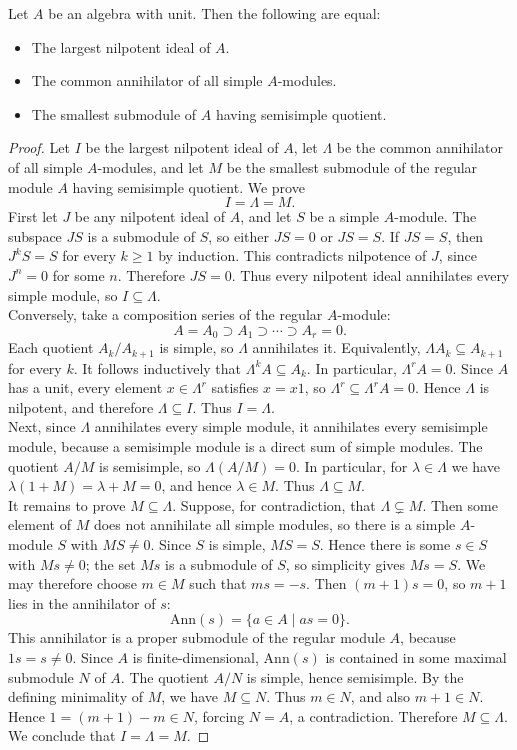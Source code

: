 \documentclass[../Odyssey_Project.tex]{subfiles}
\begin{document}
\begin{theorem}
\label{thm:13.23}
Let $A$ be an algebra with unit. Then the following are equal:
\begin{itemize}
    \item The largest nilpotent ideal of $A$.
    \item The common annihilator of all simple $A$-modules.
    \item The smallest submodule of $A$ having semisimple quotient.
\end{itemize}
\end{theorem}
\begin{proof}
    Let $I$ be the largest nilpotent ideal of $A$, let $\Lambda$ be the common annihilator of all simple $A$-modules, and let $M$ be the smallest submodule of the regular module $A$ having semisimple quotient. We prove
    \[
        I = \Lambda = M.
    \]
    First let $J$ be any nilpotent ideal of $A$, and let $S$ be a simple $A$-module. The subspace $JS$ is a submodule of $S$, so either $JS=0$ or $JS=S$. If $JS=S$, then $J^kS=S$ for every $k \geq 1$ by induction. This contradicts nilpotence of $J$, since $J^n=0$ for some $n$. Therefore $JS=0$. Thus every nilpotent ideal annihilates every simple module, so $I \subseteq \Lambda$.\\
    Conversely, take a composition series of the regular $A$-module:
    \[
        A=A_0 \supset A_1 \supset \cdots \supset A_r=0.
    \]
    Each quotient $A_k/A_{k+1}$ is simple, so $\Lambda$ annihilates it. Equivalently, $\Lambda A_k \subseteq A_{k+1}$ for every $k$. It follows inductively that $\Lambda^kA \subseteq A_k$. In particular, $\Lambda^rA=0$. Since $A$ has a unit, every element $x\in\Lambda^r$ satisfies $x=x1$, so $\Lambda^r\subseteq\Lambda^rA=0$. Hence $\Lambda$ is nilpotent, and therefore $\Lambda \subseteq I$. Thus $I=\Lambda$.\\
    Next, since $\Lambda$ annihilates every simple module, it annihilates every semisimple module, because a semisimple module is a direct sum of simple modules. The quotient $A/M$ is semisimple, so $\Lambda(A/M)=0$. In particular, for $\lambda\in\Lambda$ we have $\lambda(1+M)=\lambda+M=0$, and hence $\lambda\in M$. Thus $\Lambda \subseteq M$.\\
    It remains to prove $M \subseteq \Lambda$. Suppose, for contradiction, that $\Lambda \subsetneq M$. Then some element of $M$ does not annihilate all simple modules, so there is a simple $A$-module $S$ with $MS \neq 0$. Since $S$ is simple, $MS=S$. Hence there is some $s\in S$ with $Ms\neq0$; the set $Ms$ is a submodule of $S$, so simplicity gives $Ms=S$. We may therefore choose $m \in M$ such that $ms=-s$. Then $(m+1)s=0$, so $m+1$ lies in the annihilator of $s$:
    \[
        \mathrm{Ann}(s)=\{a \in A \mid as=0\}.
    \]
    This annihilator is a proper submodule of the regular module $A$, because $1s=s \neq 0$. Since $A$ is finite-dimensional, $\mathrm{Ann}(s)$ is contained in some maximal submodule $N$ of $A$. The quotient $A/N$ is simple, hence semisimple. By the defining minimality of $M$, we have $M \subseteq N$. Thus $m \in N$, and also $m+1 \in N$. Hence $1=(m+1)-m \in N$, forcing $N=A$, a contradiction. Therefore $M \subseteq \Lambda$. We conclude that $I=\Lambda=M$.
\end{proof}
\end{document}
